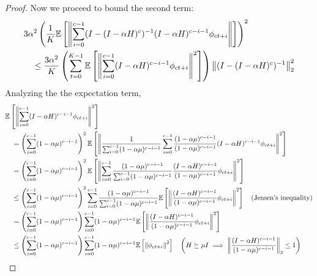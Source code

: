 \begin{proof}
Now we proceed to bound the second term:
\begin{align*}
    & 3 \alpha^2\left(\frac{1}{K} \mathbb{E}\left[ \left\|\sum_{i=0}^{c-1} (I - (I-\alpha H)^c)^{-1} (I - \alpha H)^{c-i-1} \phi_{ct+i}\right\| \right]\right)^2 \\
    &\quad \leq \frac{3\alpha^2}{K} \left( \sum_{t=0}^{K-1} \mathbb{E}\left[ \left\|\sum_{i=0}^{c-1} (I - \alpha H)^{c-i-1} \phi_{ct+i}\right\|^2 \right] \right) \left\| (I - (I - \alpha H)^c)^{-1} \right\|_2^2
\end{align*}
Analyzing the the expectation term, 
\begin{align*}
    & \mathbb{E}\left[ \left\| \sum_{i=0}^{c-1} (I - \alpha H)^{c-i-1}\phi_{ct+i} \right\|^2 \right] \\
    & \quad = \left( \sum_{i=0}^{c-1} (1 - \alpha \mu )^{c-i-1} \right)^2 \mathbb{E}\left[ \left\| \frac{1}{\sum_{i=0}^{c-1}(1-\alpha \mu)^{c-i-1}}\sum_{i=0}^{c-1} \frac{(1-\alpha\mu)^{c-i-1}}{(1-\alpha\mu)^{c-i-1}}(I - \alpha H)^{c-i-1}\phi_{ct+i} \right\|^2 \right] \\
    & \quad = \left( \sum_{i=0}^{c-1} (1 - \alpha \mu )^{c-i-1} \right)^2 
    \mathbb{E}\left[ \left\| 
        \sum_{i=0}^{c-1} 
            \frac{(1-\alpha\mu)^{c-i-1}}{\sum_{i=0}^{c-1}(1-\alpha \mu)^{c-i-1}}
            \frac{(I - \alpha H)^{c-i-1}}{(1-\alpha\mu)^{c-i-1}}\phi_{ct+i} \right\|^2 \right] \\
     & \quad \leq \left( \sum_{i=0}^{c-1} (1 - \alpha \mu )^{c-i-1} \right)^2 
        \sum_{i=0}^{c-1} \frac{(1-\alpha\mu)^{c-i-1}}{\sum_{i=0}^{c-1}(1-\alpha \mu)^{c-i-1}}
        \mathbb{E}\left[ \left\| 
            \frac{(I - \alpha H)^{c-i-1}}{(1-\alpha\mu)^{c-i-1}}\phi_{ct+i} \right\|^2 \right]
        \quad (\text{Jensen's inequality}) \\
    & \quad = \left( \sum_{i=0}^{c-1} (1 - \alpha \mu )^{c-i-1} \right)\sum_{i=0}^{c-1} (1 - \alpha \mu)^{c-i-1} \mathbb{E}\left[ \left\|\frac{(I-\alpha H)^{c-i-1}}{(1-\alpha\mu)^{c-i-1}}\phi_{ct+i}\right\|^2 \right] \\
    & \quad \leq \left( \sum_{i=0}^{c-1} (1 - \alpha \mu )^{c-i-1} \right)\sum_{i=0}^{c-1} (1 - \alpha \mu)^{c-i-1} \mathbb{E}\left[ \left\|\phi_{ct+i}\right\|^2 \right] \quad 
    \left(H \succeq \mu I \implies \left\| \frac{(I - \alpha H)^{c-i-1}}{(1 - \alpha \mu)^{c-i-1}} \right\|_2 \leq 1 \right)
\end{align*}


\end{proof}
